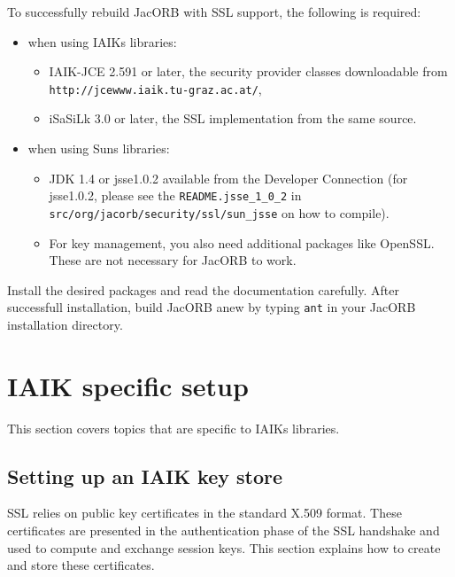 \documentclass[12pt]{scrbook}
\begin{document}
To  successfully rebuild  JacORB with  SSL support,  the  following is
required:

\begin{itemize}
        \item when using IAIKs libraries:
              \begin{itemize}
                \item IAIK-JCE 2.591 or later, the security provider classes
                downloadable from \\ {\tt http://jcewww.iaik.tu-graz.ac.at/},
              \item iSaSiLk 3.0 or later, the SSL implementation from the same
                source.
              \end{itemize}

        \item when using Suns libraries:
              \begin{itemize}
              \item JDK 1.4 or jsse1.0.2 available from the Developer
                Connection (for jsse1.0.2, please see the {\tt README.jsse\_1\_0\_2} in
                {\tt src/org/jacorb/security/ssl/sun\_jsse} on how to compile).
              \item For key management, you also need additional packages like
                OpenSSL. These are not necessary for JacORB to work.
              \end{itemize}
\end{itemize}

Install the desired packages and read the documentation carefully. After
successfull installation, build JacORB anew by typing {\tt ant} in your JacORB
installation directory.


\section{IAIK specific setup}
This section covers topics that are specific to IAIKs libraries.

\subsection{Setting up an IAIK key store}

SSL  relies   on  public  key  certificates  in   the  standard  X.509
format. These  certificates are presented in  the authentication phase
of the  SSL handshake and used  to compute and  exchange session keys.
This section explains how to create and store these certificates.
\end{document}
